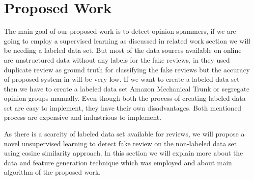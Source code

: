 \documentclass[sigconf]{acmart}
\begin{document}
\section{Proposed Work}
The main goal of our proposed work is to detect opinion spammers, if we are going to employ a supervised learning as discussed in related work section we will be needing a labeled data set. But most of the data sources available on online are unstructured data without any labels for the fake reviews, in \cite{8026958} they used duplicate review as ground truth for classifying the fake reviews but the accuracy of proposed system in \cite{8026958} will be very low. If we want to create a labeled data set then we have to create a labeled data set Amazon Mechanical Trunk \cite{6681365} or segregate opinion groups manually. Even though both the process of creating labeled data set are easy to implement, they have their own disadvantages. Both mentioned process are expensive and industrious to implement. 

As there is a scarcity of labeled data set available for reviews, we will propose a novel unsupervised learning to detect fake review on the non-labeled data set using cosine similarity approach. In this section we will explain more about the data and feature generation technique which was employed and about main algorithm of the proposed work.
\end{document}
